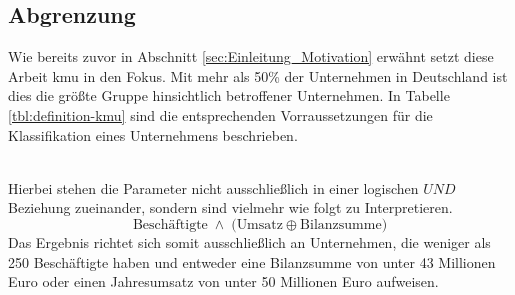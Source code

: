 \documentclass[11pt,a4paper,hidelinks]{article}   %
\begin{document}
    \subsection{Abgrenzung}
        Wie bereits zuvor in Abschnitt \ref{sec:Einleitung_Motivation} erwähnt setzt diese Arbeit \gls{kmu} in den Fokus. Mit mehr als 50\% der Unternehmen in Deutschland ist dies die größte Gruppe hinsichtlich betroffener Unternehmen. In Tabelle \ref{tbl:definition-kmu} sind die entsprechenden Vorraussetzungen für die Klassifikation eines Unternehmens beschrieben. 
        \begin{table}[ht]
            \caption[Definition von kleinen und mittleren Unternehmen]{Definition von kleinen und mittleren Unternehmen\footnotemark}
            \label{tbl:definition-kmu}
        \end{table} \\
        Hierbei stehen die Parameter nicht ausschließlich in einer logischen \(UND\) Beziehung zueinander, sondern sind vielmehr wie folgt zu Interpretieren.
            \[
            \text{Besch\"aftigte} \;\land\;
            \bigl( \text{Umsatz} \oplus \text{Bilanzsumme} \bigr)
            \]
        Das Ergebnis richtet sich somit ausschließlich an Unternehmen, die weniger als 250 Beschäftigte haben und entweder eine Bilanzsumme von unter 43 Millionen Euro oder einen Jahresumsatz von unter 50 Millionen Euro aufweisen.
\end{document}
